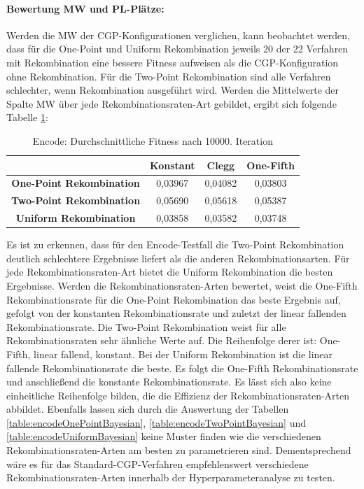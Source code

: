 \paragraph{Bewertung MW und PL-Plätze:}
Werden die MW der CGP-Konfigurationen verglichen, kann beobachtet werden, dass für die One-Point und Uniform Rekombination jeweils 20 der 22 Verfahren mit Rekombination eine bessere Fitness aufweisen als die CGP-Konfiguration ohne Rekombination.
Für die Two-Point Rekombination sind alle Verfahren schlechter, wenn Rekombination ausgeführt wird.
Werden die Mittelwerte der Spalte MW über jede Rekombinationsraten-Art gebildet, ergibt sich folgende Tabelle \ref{table:encodeMW}:

\begin{table}[H]
	\centering
	\begin{tabular} {c | c | c | c}
		& \textbf{Konstant} & \textbf{Clegg} & \textbf{One-Fifth} \\
		\hline
		\textbf{One-Point Rekombination} & 0,03967 & 0,04082 & 0,03803\\
		\hline
		\textbf{Two-Point Rekombination} & 0,05690 & 0,05618 & 0,05387\\
		\hline
		\textbf{Uniform Rekombination} & 0,03858 & 0,03582 & 0,03748\\
	\end{tabular}
	\caption{Encode: Durchschnittliche Fitness nach 10000. Iteration}
	\label{table:encodeMW}
\end{table}

Es ist zu erkennen, dass für den Encode-Testfall die Two-Point Rekombination deutlich schlechtere Ergebnisse liefert als die anderen Rekombinationsarten.
Für jede Re\-kom\-bi\-na\-tions\-ra\-ten-Art bietet die Uniform Rekombination die besten Ergebnisse.
Werden die Re\-kom\-bi\-na\-tions\-ra\-ten-Ar\-ten bewertet, weist die One-Fifth Rekombinationsrate für die One-Point Rekombination das beste Ergebnis auf, gefolgt von der konstanten Rekombinationsrate und zuletzt der linear fallenden Rekombinationsrate.
Die Two-Point Rekombination weist für alle Rekombinationsraten sehr ähnliche Werte auf.
Die Reihenfolge derer ist: One-Fifth, linear fallend, konstant.
Bei der Uniform Rekombination ist die linear fallende Rekombinationsrate die beste.
Es folgt die One-Fifth Rekombinationsrate und anschließend die konstante Rekombinationsrate.
Es lässt sich also keine einheitliche Reihenfolge bilden, die die Effizienz der Rekombinationsraten-Arten abbildet.
Ebenfalls lassen sich durch die Auswertung der Tabellen \ref{table:encodeOnePointBayesian}, \ref{table:encodeTwoPointBayesian} und \ref{table:encodeUniformBayesian} keine Muster finden wie die verschiedenen Re\-kom\-bi\-na\-tions\-ra\-ten-Ar\-ten am besten zu parametrieren sind.
Dementsprechend wäre es für das Standard-CGP-Verfahren empfehlenswert verschiedene Rekombinationsraten-Arten innerhalb der Hyperparameteranalyse zu testen.
